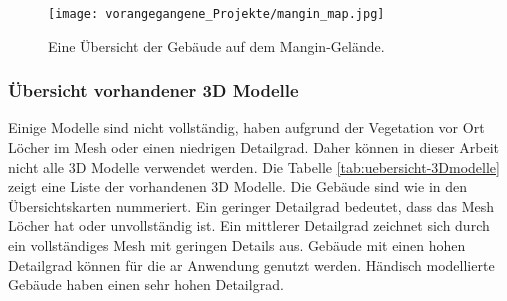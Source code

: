 \begin{figure}[h]
    \centering
    \texttt{[image: vorangegangene\_Projekte/mangin\_map.jpg]}
    \caption{Eine Übersicht der Gebäude auf dem Mangin-Gelände.}
    \label{fig:mangin-map}
\end{figure}
\subsubsection{Übersicht vorhandener 3D Modelle}
Einige Modelle sind nicht vollständig, haben aufgrund der Vegetation vor Ort Löcher im Mesh oder einen niedrigen Detailgrad. Daher können in dieser Arbeit nicht alle 3D Modelle verwendet werden. Die Tabelle \ref{tab:uebersicht-3Dmodelle} zeigt eine Liste der vorhandenen 3D Modelle. Die Gebäude sind wie in den Übersichtskarten nummeriert. Ein geringer Detailgrad bedeutet, dass das Mesh Löcher hat oder unvollständig ist. Ein mittlerer Detailgrad zeichnet sich durch ein vollständiges Mesh mit geringen Details aus. Gebäude mit einen hohen Detailgrad können für die \Gls{ar} Anwendung genutzt werden. Händisch modellierte Gebäude haben einen sehr hohen Detailgrad.
